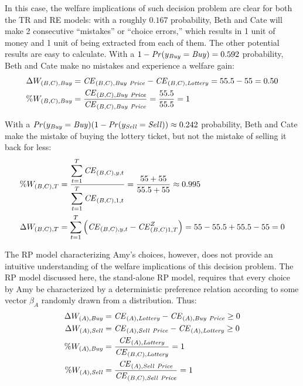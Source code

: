 \documentclass[../main.tex]{subfiles}
\begin{document}
In this case, the welfare implications of such decision problem are clear for both the TR and RE  models: with a roughly $0.167$ probability, Beth and Cate will make 2 consecutive \enquote{mistakes} or \enquote{choice errors,} which results in 1 unit of money and 1 unit of {\CE} being extracted from each of them.
The other potential results are easy to calculate.
With a ${1- {\mathit{Pr}}(y_{\mathit{Buy}}} = \mathit{Buy}) = 0.592$ probability, Beth and Cate make no mistakes and experience a welfare gain:
\begin{align}
	\begin{split}
		\Delta W_{(B,C),\mathit{Buy}} &= {\mathit{CE}}_{(B,C),\mathit{Buy\ Price}} - {\mathit{CE}}_{(B,C),\mathit{Lottery}} = 55.5 - 55 = 0.50\\
		\% W_{(B,C),\mathit{Buy}} &= \frac{{\mathit{CE}}_{(B,C),\mathit{Buy\ Price}}}{{\mathit{CE}}_{(B,C),\mathit{Buy\ Price}}} = \frac{55.5}{55.5} = 1
	\end{split}
\end{align}

With a $ {\mathit{Pr}}(y_{\mathit{Buy}} = \mathit{Buy})(1 - {\mathit{Pr}}(y_{\mathit{Sell}}= \mathit{Sell})) \approx 0.242$ probability, Beth and Cate make the mistake of buying the lottery ticket, but not the mistake of selling it back for less:
\begin{align}
	\begin{split}
		\%W_{(B,C),T} &= \frac{\displaystyle\sum_{t=1}^{T} {\mathit{CE}}_{(B,C),y,t} }{\displaystyle\sum_{t=1}^{T} {\mathit{CE}}_{(B,C),1,t}} = \frac{55 + 55}{55.5 + 55} \approx 0.995 \\
		\Delta W_{(B,C),T} &= \sum_{t=1}^T \left( {\mathit{CE}}_{(B,C),y,t} - {\mathit{CE}}_{(B,C)1,T}^Z \right)= 55 - 55.5 + 55.5 - 55 = 0
	\end{split}
\end{align}

The RP model characterizing Amy's choices, however, does not provide an intuitive understanding of the welfare implications of this decision problem.
The RP model discussed here, the stand-alone RP model, requires that every choice by Amy be characterized by a deterministic preference relation according to some vector $\beta_A$ randomly drawn from a distribution.
Thus:
\begin{align}
	\label{eq2:RP.welfare}
	\begin{split}
		\Delta W_{(A),\mathit{Buy}} &= {\mathit{CE}}_{(A),\mathit{Lottery}} - {\mathit{CE}}_{(A),\mathit{Buy\ Price}} \geq 0\\
		\Delta W_{(A),\mathit{Sell}} &= {\mathit{CE}}_{(A),\mathit{Sell\ Price}} - {\mathit{CE}}_{(A),\mathit{Lottery}} \geq 0\\
		\% W_{(A),\mathit{Buy}} &= \frac{{\mathit{CE}}_{(A),\mathit{Lottery}}}{{\mathit{CE}}_{(B,C),\mathit{Lottery}}} = 1\\
		\% W_{(A),\mathit{Sell}} &= \frac{{\mathit{CE}}_{(A),\mathit{Sell\ Price}}}{{\mathit{CE}}_{(B,C),\mathit{Sell\ Price}}} = 1
	\end{split}
\end{align}
\end{document}
